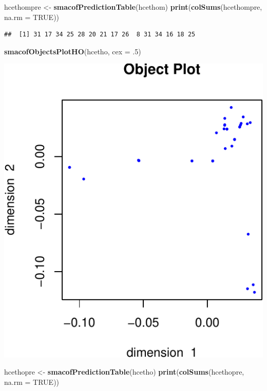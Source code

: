 \documentclass[
  12pt,
]{article}
\newenvironment{Shaded}{\begin{snugshade}}{\end{snugshade}}
\newcommand{\AttributeTok}[1]{\textcolor[rgb]{0.13,0.29,0.53}{#1}}
\newcommand{\ConstantTok}[1]{\textcolor[rgb]{0.56,0.35,0.01}{#1}}
\newcommand{\DecValTok}[1]{\textcolor[rgb]{0.00,0.00,0.81}{#1}}
\newcommand{\FunctionTok}[1]{\textcolor[rgb]{0.13,0.29,0.53}{\textbf{#1}}}
\newcommand{\NormalTok}[1]{#1}
\newcommand{\OtherTok}[1]{\textcolor[rgb]{0.56,0.35,0.01}{#1}}
\begin{document}
\begin{Shaded}
\begin{Highlighting}[]
\NormalTok{hcethompre }\OtherTok{\textless{}{-}} \FunctionTok{smacofPredictionTable}\NormalTok{(hcethom)}
\FunctionTok{print}\NormalTok{(}\FunctionTok{colSums}\NormalTok{(hcethompre, }\AttributeTok{na.rm =} \ConstantTok{TRUE}\NormalTok{))}
\end{Highlighting}
\end{Shaded}

\begin{verbatim}
##  [1] 31 17 34 25 28 20 21 17 26  8 31 34 16 18 25
\end{verbatim}

\begin{Shaded}
\begin{Highlighting}[]
\FunctionTok{smacofObjectsPlotHO}\NormalTok{(hcetho, }\AttributeTok{cex =}\NormalTok{ .}\DecValTok{5}\NormalTok{)}
\end{Highlighting}
\end{Shaded}

\includegraphics{smacofHO_files/figure-latex/unnamed-chunk-1-2.pdf}

\begin{Shaded}
\begin{Highlighting}[]
\NormalTok{hcethopre }\OtherTok{\textless{}{-}} \FunctionTok{smacofPredictionTable}\NormalTok{(hcetho)}
\FunctionTok{print}\NormalTok{(}\FunctionTok{colSums}\NormalTok{(hcethopre, }\AttributeTok{na.rm =} \ConstantTok{TRUE}\NormalTok{))}
\end{Highlighting}
\end{Shaded}
\end{document}

